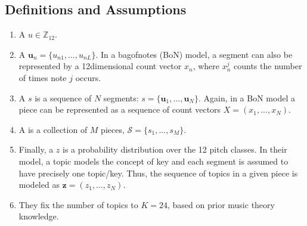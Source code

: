 \documentclass[letterpaper,10pt,english]{sphinxmanual}
\begin{document}
\subsection{Definitions and Assumptions}
\label{\detokenize{topic_modeling:definitions-and-assumptions}}\begin{enumerate}
%
\item {} 
\sphinxAtStartPar
A  \(u \in \mathbb Z_{12}\).

\item {} 
\sphinxAtStartPar
A  \(\mathbf{u}_n = \{u_{n1}, \ldots{}, u_{nL}\}\). In a
bag\sphinxhyphen{}of\sphinxhyphen{}notes (BoN) model, a segment can also be represented by a
12\sphinxhyphen{}dimensional count vector \(x_n\), where \(x_n^j\) counts
the number of times note \(j\) occurs.

\item {} 
\sphinxAtStartPar
A  \(s\) is a sequence of \(N\) segments:
\(s=\{\mathbf u_1, ..., \mathbf u_N \}\). Again, in a BoN model a
piece can be represented as a sequence of count vectors
\(X=(x_1, ..., x_N)\).

\item {} 
\sphinxAtStartPar
A  is a collection of \(M\) pieces,
\(\mathcal S = \{s_1, ..., s_M\}\).

\item {} 
\sphinxAtStartPar
Finally, a  \(z\) is a probability distribution over the
12 pitch classes. In their model, a topic models the concept of key
and each segment is assumed to have precisely one topic/key. Thus,
the sequence of topics in a given piece is modeled as
\(\mathbf z = (z_1, ..., z_N)\).

\item {} 
\sphinxAtStartPar
They fix the number of topics to \(K=24\), based on prior music
theory knowledge.

\end{enumerate}
\end{document}
